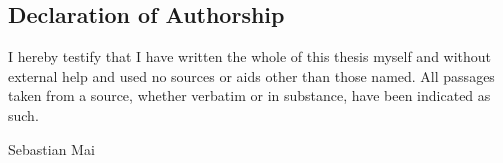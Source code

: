 
\subsection*{ Declaration of Authorship }

I hereby testify that I have written the whole of this thesis myself and without external help and used no sources or aids other than those named.
All passages taken from a source, whether verbatim or in substance, have been indicated as such.




Sebastian Mai

